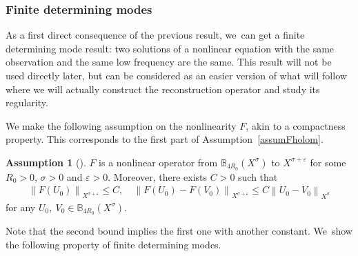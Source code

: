\documentclass[JEP,XML,SOM,Unicode,published]{cedram}
\theoremstyle{definition}
\newtheorem{assum}{Assumption}
\newenvironment{assump}[2][]
{\renewcommand\theassum{#2}\begin{assum}[#1]}
{\end{assum}}
\let\veps\varepsilon
\newcommand\nor[2]{\left\|#1\right\|_{#2}}
\begin{document}
\subsubsection{Finite determining modes}
As a first direct consequence of the previous result, we~can get a finite determining mode result: two solutions of a nonlinear equation with the same observation and the same low frequency are the same. This result will not be used directly later, but can be considered as an easier version of what will follow where we will actually construct the reconstruction operator and study its regularity.

We make the following assumption on the nonlinearity $F$, akin to a compactness property. This corresponds to the first part of Assumption~\ref{assumFholom}.

\begin{assump}{3a}
\label{assumF}
$F$ is a nonlinear operator from $\mathbb{B}_{4R_{0}}(X^{\sigma})$ to $X^{\sigma+\veps}$ for some $R_{0}>0$, $\sigma>0$ and $\veps>0$. Moreover, there exists $C>0$ such that
\begin{align}
\label{boundF}
\nor{F(U_{0})}{X^{\sigma+\veps}}\leq C,\quad \nor{F(U_{0})-F(V_{0})}{X^{\sigma+\veps}}\leq C \nor{U_{0}-V_{0}}{X^{\sigma}}
\end{align}
for any $U_{0},~V_{0}\in \mathbb{B}_{4R_{0}}(X^{\sigma})$.
\end{assump}

Note that the second bound implies the first one with another constant. We~show the following property of finite determining modes.
\end{document}

